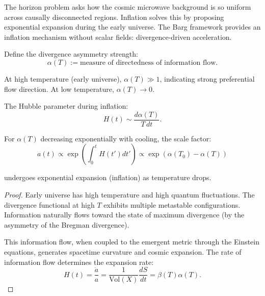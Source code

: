 \begin{theorem}
\label{thm:inflationFromDivergence}

The horizon problem asks how the cosmic microwave background is so uniform across causally disconnected regions. Inflation solves this by proposing exponential expansion during the early universe. The Barg framework provides an inflation mechanism without scalar fields: divergence-driven acceleration.

\begin{definition}

Define the divergence asymmetry strength:
\begin{equation}
\alpha(T) := \text{measure of directedness of information flow}.
\end{equation}

At high temperature (early universe), $\alpha(T) \gg 1$, indicating strong preferential flow direction. At low temperature, $\alpha(T) \to 0$.

The Hubble parameter during inflation:
\begin{equation}
H(t) \sim \frac{d\alpha(T)}{T \, dt}.
\end{equation}

For $\alpha(T)$ decreasing exponentially with cooling, the scale factor:
\begin{equation}
a(t) \propto \exp\left(\int_0^t H(t') dt'\right) \propto \exp(\alpha(T_0) - \alpha(T))
\end{equation}

undergoes exponential expansion (inflation) as temperature drops.

\end{definition}

\begin{proof}

Early universe has high temperature and high quantum fluctuations. The divergence functional at high $T$ exhibits multiple metastable configurations. Information naturally flows toward the state of maximum divergence (by the asymmetry of the Bregman divergence).

This information flow, when coupled to the emergent metric through the Einstein equations, generates spacetime curvature and cosmic expansion. The rate of information flow determines the expansion rate:
\begin{equation}
H(t) = \frac{\dot{a}}{a} = \frac{1}{\text{Vol}(X)} \frac{dS}{dt} = \beta(T) \alpha(T).
\end{equation}


\end{proof}
\end{theorem}
